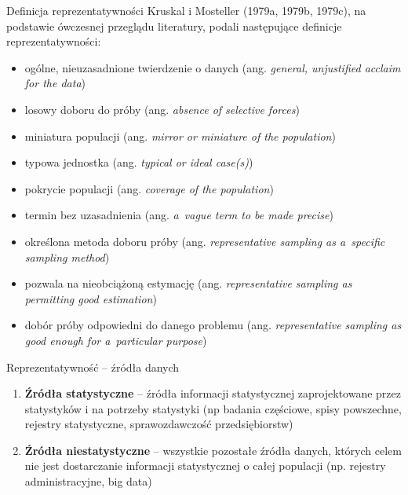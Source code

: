 \documentclass[10pt,ignorenonframetext, aspectratio=169]{beamer}
\begin{document}
\begin{frame}{Definicja reprezentatywności}
    Kruskal i Mosteller (1979a, 1979b, 1979c), na podstawie ówczesnej przeglądu literatury, podali następujące definicje reprezentatywności:

\begin{itemize}
\justifying
\item ogólne, nieuzasadnione twierdzenie o danych  (ang. \textit{general, unjustified acclaim for the data})
\item losowy doboru do próby (ang. \textit{absence of selective forces})
\item miniatura populacji (ang. \textit{mirror or miniature of the population})
\item typowa jednostka (ang. \textit{typical or ideal case(s)})
\item pokrycie populacji (ang. \textit{coverage of the population})
\item termin bez uzasadnienia (ang. \textit{a~vague term to be made precise})
\item określona metoda doboru próby (ang. \textit{representative sampling as a~specific sampling method})
\item pozwala na nieobciążoną estymację (ang. \textit{representative sampling as permitting good estimation})
\item dobór próby odpowiedni do danego problemu (ang. \textit{representative sampling as good enough for a~particular purpose})
\end{itemize}
\end{frame}

\begin{frame}{Reprezentatywność -- źródła danych }
    \begin{enumerate}
        \item \textbf{Źródła statystyczne} -- źródła informacji statystycznej zaprojektowane przez statystyków i na potrzeby statystyki (np badania częściowe, spisy powszechne, rejestry statystyczne, sprawozdawczość przedsiębiorstw)
        \item \textbf{Źródła niestatystyczne} -- wszystkie pozostałe źródła danych, których celem nie jest dostarczanie informacji statystycznej o całej populacji (np. rejestry administracyjne, big data)
    \end{enumerate}
\end{frame}
\end{document}

